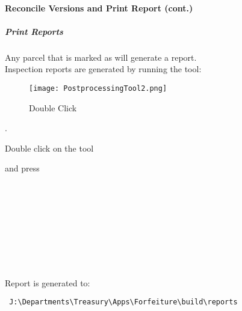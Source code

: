  \clearpage

{
 \paragraph*{Reconcile Versions and Print Report {\footnotesize (cont.)}}

 \vspace{.5in}
 
 \subparagraph{Print Reports}

Any parcel that is marked {\bigbtn{}} as {\bigbtn{}} will generate a report.\\ 
 
\noindent Inspection reports are generated by running the tool:



\begin{wrapfigure}{r}{0.4\textwidth}

\centering
     \texttt{[image: PostprocessingTool2.png]}
 \caption{Double Click}
 \end{wrapfigure}
 .

 \vspace{2in}
 

 \noindent Double click on the tool\\
 
 \noindent and press {\btn{}}
 }
 \\ \\ \\ \\ \\ \\ \\ \\
 \noindent Report is generated to: 
 
 
 \begin{verbatim}
 J:\Departments\Treasury\Apps\Forfeiture\build\reports
 \end{verbatim}

 \clearpage


